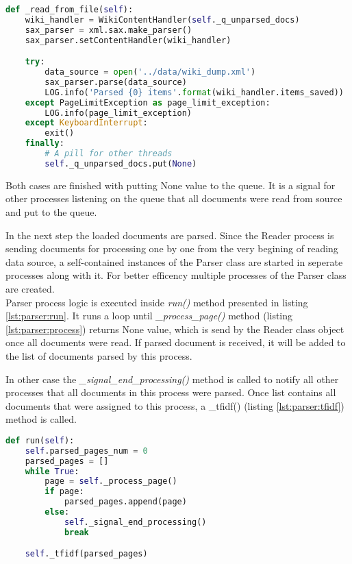 \begin{lstlisting}[language=Python, caption={Reader.\_read\_from\_file() - reading documents from XML file}, label={lst:reader:xml}]
def _read_from_file(self):
    wiki_handler = WikiContentHandler(self._q_unparsed_docs)
    sax_parser = xml.sax.make_parser()
    sax_parser.setContentHandler(wiki_handler)

    try:
        data_source = open('../data/wiki_dump.xml')
        sax_parser.parse(data_source)
        LOG.info('Parsed {0} items'.format(wiki_handler.items_saved))
    except PageLimitException as page_limit_exception:
        LOG.info(page_limit_exception)
    except KeyboardInterrupt:
        exit()
    finally:
        # A pill for other threads
        self._q_unparsed_docs.put(None)
\end{lstlisting} \label{impl-reader-xml}

Both cases are finished with putting None value to the queue. It is a signal for other processes listening on the queue that all documents were read from source and put to the queue.

In the next step the loaded documents are parsed. Since the Reader process is sending documents for processing one by one from the very begining of reading data source, a self-contained instances of the Parser class are started in seperate processes along with it. For better efficency multiple processes of the Parser class are created. \\

Parser process logic is executed inside \textit{run()} method presented in listing \ref{lst:parser:run}. It runs a loop until \textit{\_process\_page()} method (listing \ref{lst:parser:process}) returns None value, which is send by the Reader class object once all documents were read. If parsed document is received, it will be added to the list of documents parsed by this process.

 In other case the \textit{\_signal\_end\_processing()} method is called to notify all other processes that all documents in this process were parsed. Once list contains all documents that were assigned to this process, a \_tfidf() (listing \ref{lst:parser:tfidf}) method is called.

\begin{lstlisting}[language=Python, caption={Parser.run() - Parser class process main method}, label={lst:parser:run}]
def run(self):
    self.parsed_pages_num = 0
    parsed_pages = []
    while True:
        page = self._process_page()
        if page:
            parsed_pages.append(page)
        else:
            self._signal_end_processing()
            break

    self._tfidf(parsed_pages)
\end{lstlisting}

